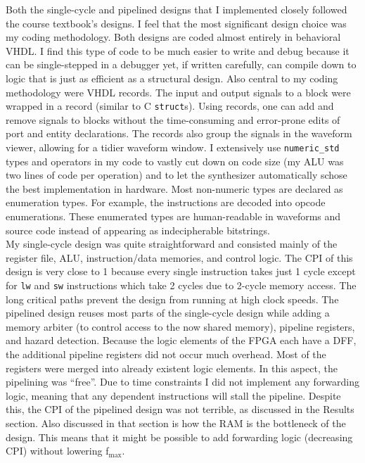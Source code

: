\documentclass[12pt]{article}
\begin{document}
Both the single-cycle and pipelined designs that I implemented closely followed the course textbook's designs. I feel that the most significant design choice was my coding methodology. Both designs are coded almost entirely in behavioral VHDL. I find this type of code to be much easier to write and debug because it can be single-stepped in a debugger yet, if written carefully, can compile down to logic that is just as efficient as a structural design. Also central to my coding methodology were VHDL records. The input and output signals to a block were wrapped in a record (similar to C \texttt{struct}s). Using records, one can add and remove signals to blocks without the time-consuming and error-prone edits of port and entity declarations. The records also group the signals in the waveform viewer, allowing for a tidier waveform window. I extensively use \texttt{numeric\_std} types and operators in my code to vastly cut down on code size (my ALU was two lines of code per operation) and to let the synthesizer automatically schose the best implementation in hardware. Most non-numeric types are declared as enumeration types. For example, the instructions are decoded into opcode enumerations. These enumerated types are human-readable in waveforms and source code instead of appearing as indecipherable bitstrings.\\

My single-cycle design was quite straightforward and consisted mainly of the register file, ALU, instruction/data memories, and control logic. The CPI of this design is very close to 1 because every single instruction takes just 1 cycle except for \texttt{lw} and \texttt{sw} instructions which take 2 cycles due to 2-cycle memory access. The long critical paths prevent the design from running at high clock speeds. The pipelined design reuses most parts of the single-cycle design while adding a memory arbiter (to control access to the now shared memory), pipeline registers, and hazard detection. Because the logic elements of the FPGA each have a DFF, the additional pipeline registers did not occur much overhead. Most of the registers were merged into already existent logic elements. In this aspect, the pipelining was ``free''. Due to time constraints I did not implement any forwarding logic, meaning that any dependent instructions will stall the pipeline. Despite this, the CPI of the pipelined design was not terrible, as discussed in the Results section. Also discussed in that section is how the RAM is the bottleneck of the design. This means that it might be possible to add forwarding logic (decreasing CPI) without lowering f$_{\textrm{max}}$.
\end{document}
